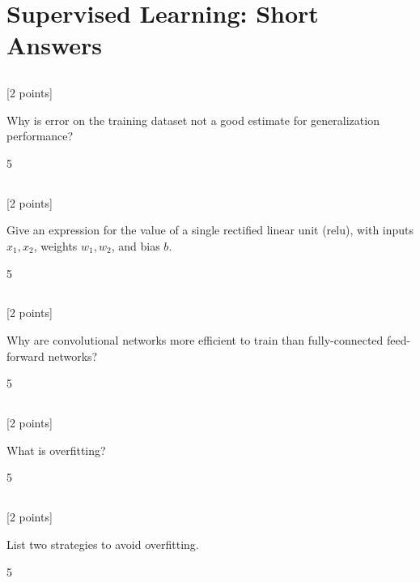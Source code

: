 \documentclass[12pt]{article}
\newcommand{\tcv}[1]{\textcolor{m4}{#1}}
\newcounter{totalpoints}
\newcommand{\points}[1]{{\addtocounter{totalpoints}{#1}\tcv{[#1 points]}}}
\begin{document}
{%

\section{Supervised Learning: Short Answers}

\subsection{}\points{2} Why is error on the training dataset not a good estimate for generalization performance?

\begin{answer}{5\baselineskip}
\end{answer}

\subsection{} \points{2} Give an expression for the value of a single rectified linear unit (relu), with inputs $x_1,x_2$, weights $w_1,w_2$, and bias $b$.

\begin{answer}{5\baselineskip}
\end{answer}

\subsection{} \points{2} Why are convolutional networks more efficient to train than fully-connected feed-forward networks?

\begin{answer}{5\baselineskip}
\end{answer}

\subsection{} \points{2}
What is overfitting?

\begin{answer}{5\baselineskip}
\end{answer}

\subsection{}  \points{2}
List two strategies to avoid overfitting.

\begin{answer}{5\baselineskip}
\end{answer}

}
\end{document}
